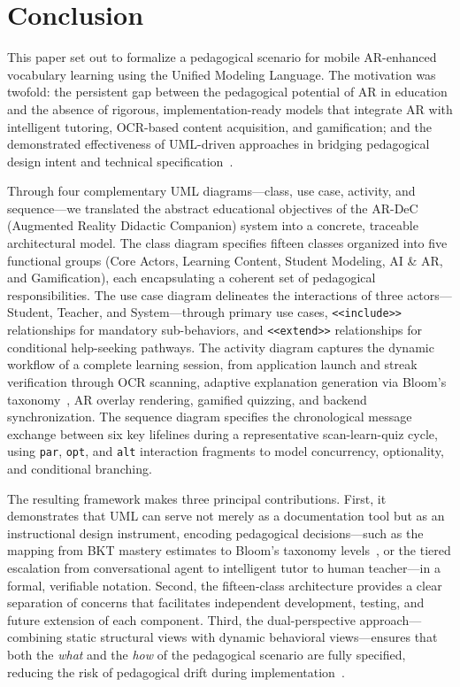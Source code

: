 \section{Conclusion}
\label{sec:conclusion}

This paper set out to formalize a pedagogical scenario for mobile AR-enhanced vocabulary learning using the Unified Modeling Language. The motivation was twofold: the persistent gap between the pedagogical potential of AR in education and the absence of rigorous, implementation-ready models that integrate AR with intelligent tutoring, OCR-based content acquisition, and gamification; and the demonstrated effectiveness of UML-driven approaches in bridging pedagogical design intent and technical specification~\cite{Booch2005,Ouariach2023,Ouariach2026}.

Through four complementary UML diagrams---class, use case, activity, and sequence---we translated the abstract educational objectives of the AR-DeC (Augmented Reality Didactic Companion) system into a concrete, traceable architectural model. The class diagram specifies fifteen classes organized into five functional groups (Core Actors, Learning Content, Student Modeling, AI \& AR, and Gamification), each encapsulating a coherent set of pedagogical responsibilities. The use case diagram delineates the interactions of three actors---Student, Teacher, and System---through primary use cases, \texttt{<<include>>} relationships for mandatory sub-behaviors, and \texttt{<<extend>>} relationships for conditional help-seeking pathways. The activity diagram captures the dynamic workflow of a complete learning session, from application launch and streak verification through OCR scanning, adaptive explanation generation via Bloom's taxonomy~\cite{Bloom1956,Krathwohl2002}, AR overlay rendering, gamified quizzing, and backend synchronization. The sequence diagram specifies the chronological message exchange between six key lifelines during a representative scan-learn-quiz cycle, using \texttt{par}, \texttt{opt}, and \texttt{alt} interaction fragments to model concurrency, optionality, and conditional branching.

The resulting framework makes three principal contributions. First, it demonstrates that UML can serve not merely as a documentation tool but as an instructional design instrument, encoding pedagogical decisions---such as the mapping from BKT mastery estimates to Bloom's taxonomy levels~\cite{Corbett1994}, or the tiered escalation from conversational agent to intelligent tutor to human teacher---in a formal, verifiable notation. Second, the fifteen-class architecture provides a clear separation of concerns that facilitates independent development, testing, and future extension of each component. Third, the dual-perspective approach---combining static structural views with dynamic behavioral views---ensures that both the \emph{what} and the \emph{how} of the pedagogical scenario are fully specified, reducing the risk of pedagogical drift during implementation~\cite{Rumbaugh2004}.

